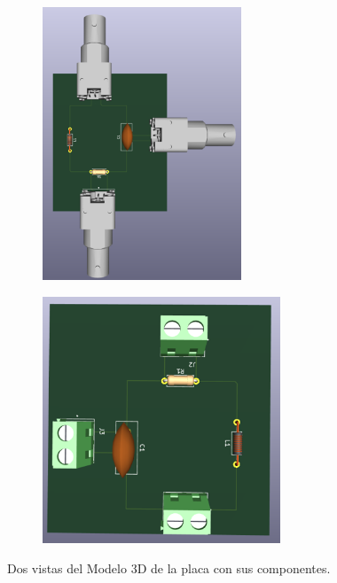 \begin{figure}[!ht]
	\begin{minipage}[c]{0.5\textwidth}
		\begin{subfigure}{\textwidth}
			\centering
			\includegraphics[width=0.65198\textwidth,angle=90,origin=c]{Figures/26_05_2025/PCB_prototipo_BNC}
			\captionsetup{width=0.8\textwidth}
			\subcaption{}
		\end{subfigure}
	\end{minipage}\begin{minipage}[c]{0.49\textwidth}
		\begin{subfigure}{\textwidth}
			\centering
			\includegraphics[width=0.78\textwidth]{Figures/26_05_2025/PCB_prototipo_Borneras}
			\captionsetup{width=0.8\textwidth}
			\subcaption{}
		\end{subfigure}
	\end{minipage}
	\caption{Dos vistas del Modelo 3D de la placa con sus componentes.}
	\label{fig:}
\end{figure}





